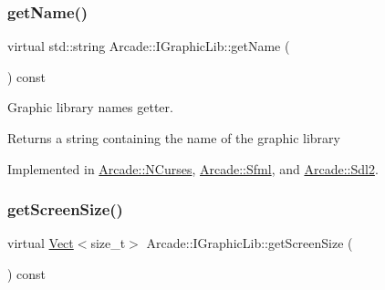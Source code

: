 \mbox{\label{class_arcade_1_1_i_graphic_lib_aecc266c4ac10f07f4cdca023e74e843d}} 
\subsubsection{\texorpdfstring{get\+Name()}{getName()}}
{\footnotesize\ttfamily virtual std\+::string Arcade\+::\+I\+Graphic\+Lib\+::get\+Name (\begin{DoxyParamCaption}{ }\end{DoxyParamCaption}) const\hspace{0.3cm}{\ttfamily [pure virtual]}}



Graphic library name\textquotesingle{}s getter. 

\begin{DoxyReturn}{Returns}
a string containing the name of the graphic library 
\end{DoxyReturn}


Implemented in \hyperlink{class_arcade_1_1_n_curses_a8674fcd61c00e65897db3435f31dfcc2}{Arcade\+::\+N\+Curses}, \hyperlink{class_arcade_1_1_sfml_a6c5776e27ea7466208ab4bd59395e344}{Arcade\+::\+Sfml}, and \hyperlink{class_arcade_1_1_sdl2_aa1d9e278616747b87d868fadb0272d43}{Arcade\+::\+Sdl2}.

\mbox{\label{class_arcade_1_1_i_graphic_lib_a0ce5eb4661d55b6e729fc1c16566dd9f}} 
\subsubsection{\texorpdfstring{get\+Screen\+Size()}{getScreenSize()}}
{\footnotesize\ttfamily virtual \hyperlink{class_arcade_1_1_vect}{Vect}$<$size\+\_\+t$>$ Arcade\+::\+I\+Graphic\+Lib\+::get\+Screen\+Size (\begin{DoxyParamCaption}{ }\end{DoxyParamCaption}) const\hspace{0.3cm}{\ttfamily [pure virtual]}}



